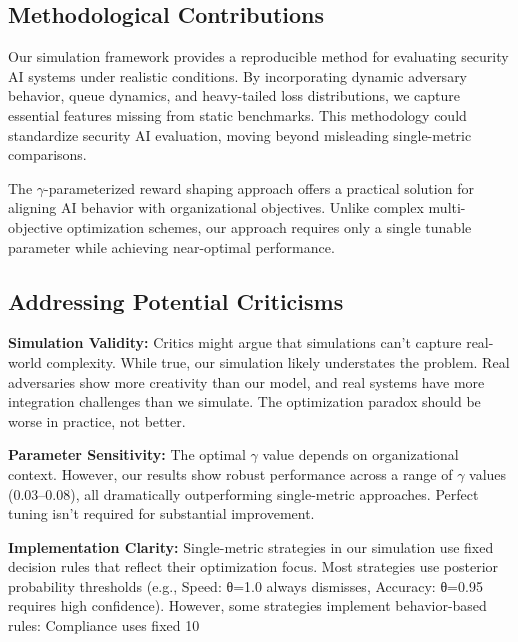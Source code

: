 \documentclass[10pt,conference]{IEEEtran}
\begin{document}
\subsection{Methodological Contributions}

Our simulation framework provides a reproducible method for evaluating security AI systems under realistic conditions. By incorporating dynamic adversary behavior, queue dynamics, and heavy-tailed loss distributions, we capture essential features missing from static benchmarks. This methodology could standardize security AI evaluation, moving beyond misleading single-metric comparisons.

The $\gamma$-parameterized reward shaping approach offers a practical solution for aligning AI behavior with organizational objectives. Unlike complex multi-objective optimization schemes, our approach requires only a single tunable parameter while achieving near-optimal performance.

\subsection{Addressing Potential Criticisms}

\textbf{Simulation Validity:} Critics might argue that simulations can't capture real-world complexity. While true, our simulation likely understates the problem. Real adversaries show more creativity than our model, and real systems have more integration challenges than we simulate. The optimization paradox should be worse in practice, not better.

\textbf{Parameter Sensitivity:} The optimal $\gamma$ value depends on organizational context. However, our results show robust performance across a range of $\gamma$ values (0.03--0.08), all dramatically outperforming single-metric approaches. Perfect tuning isn't required for substantial improvement.

\textbf{Implementation Clarity:} Single-metric strategies in our simulation use fixed decision rules that reflect their optimization focus. Most strategies use posterior probability thresholds (e.g., Speed: θ=1.0 always dismisses, Accuracy: θ=0.95 requires high confidence). However, some strategies implement behavior-based rules: Compliance uses fixed 10%
\end{document}
